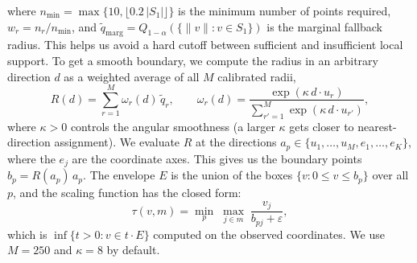 where $n_{\min}=\max\{10,\lfloor 0.2\,|S_1|\rfloor\}$ is the minimum number of points required, $w_r=n_r/n_{\min}$, and 
$\tilde q_{\mathrm{marg}}=Q_{1-\alpha}(\{\|v\|:v\in S_1\})$ is the marginal fallback radius. This helps us avoid a hard 
cutoff between sufficient and insufficient local support. To get a smooth boundary, we compute the radius in an arbitrary direction 
$d$ as a weighted average of all $M$ calibrated radii,
\begin{equation}\label{eq:smooth}
R(d)=\sum_{r=1}^{M}\omega_r(d)\,\tilde q_r,\qquad
\omega_r(d)=\frac{\exp(\kappa\,d\cdot u_r)}{\sum_{r'=1}^{M}\exp(\kappa\,d\cdot u_{r'})},
\end{equation}
where $\kappa>0$ controls the angular smoothness (a larger $\kappa$ gets closer to nearest-direction assignment). We evaluate $R$ 
at the directions $a_p\in\{u_1,\dots,u_M,e_1,\dots,e_K\}$, where the $e_j$ are the coordinate axes. This gives us the boundary points 
$b_p=R(a_p)\,a_p$. The envelope $E$ is the union of the boxes $\{v:0\le v\le b_p\}$ over all $p$, and the scaling function has the 
closed form:
\begin{equation}\label{eq:radial}
\tau(v,m)=\min_{p}\;\max_{j\in m}\;\frac{v_j}{b_{pj}+\varepsilon},
\end{equation}
which is $\inf\{t>0:v\in t\cdot E\}$ computed on the observed coordinates. We use $M=250$ and $\kappa=8$ by default.



